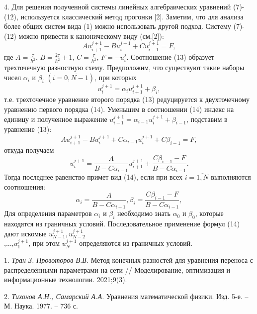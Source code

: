 4. Для решения полученной системы линейных алгебраических уравнений (7)-(12), используется классический метод прогонки [2].
Заметим, что для анализа более общих систем вида (1) можно использовать другой подход. Систему (7)-(12) можно привести к каноническому виду (см.[2]):
\begin{equation}\label{tran_eq13}
Au_{i+1}^{j+1}-Bu_{i}^{j+1}+Cu_{i-1}^{j+1}=F,
\end{equation}
где $A=\frac{\tau }{{{h}^{2}}}$, $B=\frac{2\tau }{{{h}^{2}}}+1$, $C=\frac{\tau }{{{h}^{2}}}$, $F=-u_{i}^{j}$. Соотношение (13) образует трехточечную разностную схему. Предположим, что существуют такие наборы чисел ${{\alpha }_{i}}$ и ${{\beta }_{i}}$ $\left( i=\overline{0,N-1} \right)$, при которых
\begin{equation}\label{tran_eq14}
u_{i}^{j+1}={{\alpha }_{i}}u_{i+1}^{j+1}+{{\beta }_{i}},
\end{equation}
т.е. трехточечное уравнение второго порядка (13) редуцируется к двухточечному уравнению первого порядка (14).
Уменьшим в соотношении (14) индекс на единицу и полученное выражение $u_{i-1}^{j+1}={{\alpha }_{i-1}}u_{i}^{j+1}+{{\beta }_{i-1}}$, подставим в уравнение (13):
\[Au_{i+1}^{j+1}-Bu_{i}^{j+1}+C{{\alpha }_{i-1}}u_{i}^{j+1}+C{{\beta }_{i-1}}=F,\]
откуда получаем
\[u_{i}^{j+1}=\frac{A}{B-C{{\alpha }_{i-1}}}u_{i+1}^{j+1}+\frac{C{{\beta }_{i-1}}-F}{B-C{{\alpha }_{i-1}}}.\]
Тогда последнее равенство примет вид (14), если при всех $i=\overline{1,N}$ выполняются соотношения:
\[{{\alpha }_{i}}=\frac{A}{B-C{{\alpha }_{i-1}}},{{\beta }_{i}}=\frac{C{{\beta }_{i-1}}-F}{B-C{{\alpha }_{i-1}}},\]
Для определения параметров ${{\alpha }_{i}}$ и ${{\beta }_{i}}$ необходимо знать ${{\alpha }_{0}}$ и ${{\beta }_{0}}$, которые находятся из граничных условий. Последовательное применение формул (14) дают искомые $u_{N-1}^{j+1},u_{N-2}^{j+1}$\\,...,$u_{1}^{j+1}$, при этом $u_{N}^{j+1}$ определяются из граничных условий.

\litlist

1. {\it Тран З. Провоторов В.В. }
Метод конечных разностей для уравнения переноса с распределёнными параметрами на сети // Моделирование, оптимизация и информационные технологии. 2021;9(3).

2. {\it Тихонов А.Н., Самарский А.А. }
 Уравнения математической физики. Изд. 5-е. – М. Наука. 1977. – 736 с.
